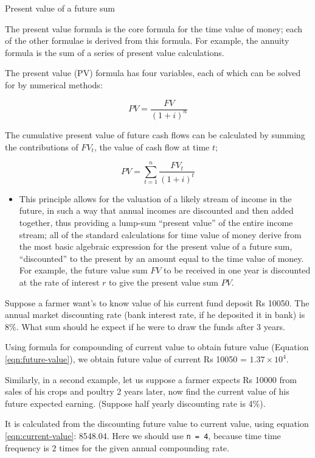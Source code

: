 \documentclass[12pt,ignorenonframetext,aspectratio=169]{beamer}
\providecommand{\tightlist}{%
  \setlength{\itemsep}{0pt}\setlength{\parskip}{0pt}}
\begin{document}
\begin{frame}{Present value of a future sum}
\protect\hypertarget{present-value-of-a-future-sum}{}
\footnotesize

The present value formula is the core formula for the time value of
money; each of the other formulae is derived from this formula. For
example, the annuity formula is the sum of a series of present value
calculations.

The present value (PV) formula has four variables, each of which can be
solved for by numerical methods:

\begin{equation}
PV = \frac{FV}{(1 + i)^n}
\label{eqn:current-value}
\end{equation}
\end{frame}

\begin{frame}{}
\protect\hypertarget{section-14}{}
The cumulative present value of future cash flows can be calculated by
summing the contributions of \(FV_t\), the value of cash flow at time
\(t\);

\[
PV = \sum_{t = 1}^n \frac{FV_t}{(1 + i)^t}
\]

\begin{itemize}
\tightlist
\item
  This principle allows for the valuation of a likely stream of income
  in the future, in such a way that annual incomes are discounted and
  then added together, thus providing a lump-sum ``present value'' of
  the entire income stream; all of the standard calculations for time
  value of money derive from the most basic algebraic expression for the
  present value of a future sum, ``discounted'' to the present by an
  amount equal to the time value of money. For example, the future value
  sum \({\displaystyle FV}\) to be received in one year is discounted at
  the rate of interest \({\displaystyle r}\) to give the present value
  sum \({\displaystyle PV}\).
\end{itemize}
\end{frame}

\begin{frame}[fragile]{}
\protect\hypertarget{section-15}{}
Suppose a farmer want's to know value of his current fund deposit Rs
10050. The annual market discounting rate (bank interest rate, if he
deposited it in bank) is 8\%. What sum should he expect if he were to
draw the funds after 3 years.

Using formula for compounding of current value to obtain future value
(Equation \ref{eqn:future-value}), we obtain future value of current Rs
10050 = \ensuremath{1.37\times 10^{4}}.

Similarly, in a second example, let us suppose a farmer expects Rs 10000
from sales of his crops and poultry 2 years later, now find the current
value of his future expected earning. (Suppose half yearly discounting
rate is 4\%).

It is calculated from the discounting future value to current value,
using equation \ref{eqn:current-value}: 8548.04. Here we should use
\texttt{n\ =\ 4}, because time time frequency is 2 times for the given
annual compounding rate.
\end{frame}
\end{document}

